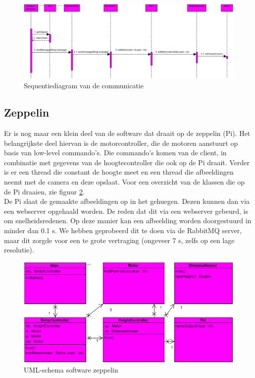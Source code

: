 \documentclass[eind]{penoverslag}
\begin{document}
\begin{figure}[H]
\begin{center}
\includegraphics[width=1\textwidth]{SequenceDiagram1.png}
\end{center}
\caption{Sequentiediagram van de communicatie}
\label{Sequence}
\end{figure} 

\subsection{Zeppelin}
Er is nog maar een klein deel van de software dat draait op de zeppelin (Pi). Het belangrijkste deel hiervan is de motorcontroller, die de motoren aanstuurt op basis van low-level commando's. Die commando's komen van de client, in combinatie met gegevens van de hoogtecontroller die ook op de Pi draait. Verder is er een thread die constant de hoogte meet en een thread die afbeeldingen neemt met de camera en deze opslaat. Voor een overzicht van de klassen die op de Pi draaien, zie figuur \ref{softwareZeppelin}.\\

De Pi slaat de gemaakte afbeeldingen op in het gehuegen. Dezen kunnen dan via een webserver opgehaald worden. De reden dat dit via een webserver gebeurd, is om snelheidsredenen. Op deze manier kan een afbeelding worden doorgestuurd in minder dan 0.1 s. We hebben geprobeerd dit te doen via de RabbitMQ server, maar dit zorgde voor een te grote vertraging (ongeveer 7 s, zelfs op een lage resolutie). \\

\begin{figure}[H]
\begin{center}
\includegraphics[width=\textwidth]{classdiagrampeno2.png}
\end{center}
\caption{UML-schema software zeppelin}
\label{softwareZeppelin}
\end{figure}
\end{document}
